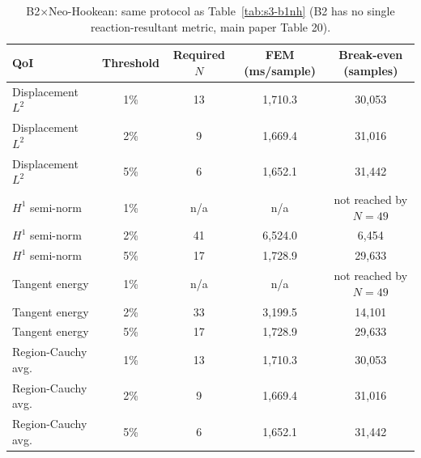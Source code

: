 \documentclass[11pt]{article}
\begin{document}
\begin{table}[h]
\centering
\caption{B2$\times$Neo-Hookean: same protocol as Table~\ref{tab:s3-b1nh}
  (B2 has no single reaction-resultant metric, main paper Table 20).}
\label{tab:s3-b2nh}
\small
\begin{tabular}{lcccc}
\toprule
QoI & Threshold & Required $N$ & FEM (ms/sample) & Break-even (samples) \\
\midrule
Displacement $L^2$  & 1\% & 13  & 1{,}710.3 & 30{,}053 \\
Displacement $L^2$  & 2\% & 9   & 1{,}669.4 & 31{,}016 \\
Displacement $L^2$  & 5\% & 6   & 1{,}652.1 & 31{,}442 \\
$H^1$ semi-norm     & 1\% & n/a & n/a       & not reached by $N{=}49$ \\
$H^1$ semi-norm     & 2\% & 41  & 6{,}524.0 & 6{,}454 \\
$H^1$ semi-norm     & 5\% & 17  & 1{,}728.9 & 29{,}633 \\
Tangent energy      & 1\% & n/a & n/a       & not reached by $N{=}49$ \\
Tangent energy      & 2\% & 33  & 3{,}199.5 & 14{,}101 \\
Tangent energy      & 5\% & 17  & 1{,}728.9 & 29{,}633 \\
Region-Cauchy avg.\ & 1\% & 13  & 1{,}710.3 & 30{,}053 \\
Region-Cauchy avg.\ & 2\% & 9   & 1{,}669.4 & 31{,}016 \\
Region-Cauchy avg.\ & 5\% & 6   & 1{,}652.1 & 31{,}442 \\
\bottomrule
\end{tabular}
\end{table}
\end{document}
